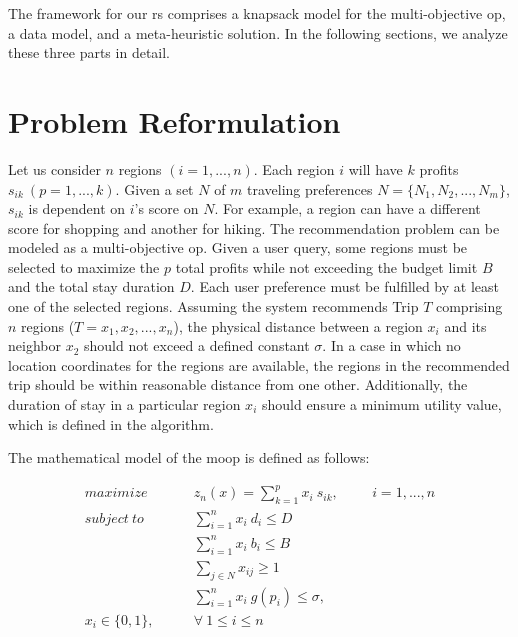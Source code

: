 The framework for our \gls{rs} comprises a knapsack model for the multi-objective \gls{op}, a data model, and a meta-heuristic solution. In the following sections, we analyze these three parts in detail.


\section{Problem Reformulation} \label{sec:problem_definition}

Let us consider $n$ regions $(i = 1, ..., n)$. Each region $i$ will have $k$ profits $s_{ik}\ (p = 1, ...,k)$. Given a set $N$ of $m$ traveling preferences $N = \{N_1, N_2,...,N_m\}$, $s_{ik}$ is dependent on $i$'s score on $N$. For example, a region can have a different score for shopping and another for hiking.
The recommendation problem can be modeled as a multi-objective \gls{op}. Given a user query, some regions must be selected to maximize the $p$ total profits while not exceeding the budget limit $B$ and the total stay duration $D$. Each user preference must be fulfilled by at least one of the selected regions. Assuming the system recommends Trip $T$ comprising $n$ regions ($T = {x_1, x_2, ..., x_n}$), the physical distance between a region $x_i$ and its neighbor $x_2$ should not exceed a defined constant $\sigma$. In a case in which no location coordinates for the regions are available, the regions in the recommended trip should be within reasonable distance from one other. Additionally, the duration of stay in a particular region ${x_i}$ should ensure a minimum utility value, which is defined in the algorithm.

The mathematical model of the \gls{moop} is defined as follows:

\begin{align}
    \tag{1}maximize \qquad  &z_n(x) = \sum_{k=1}^p x_i\ s_{ik}, \hspace{1cm} i = 1,...,n \label{eq:3_1a}\\
    \tag{2}subject \ to \qquad &\sum_{i=1}^n x_i\ d_i  \leq D \label{eq:3_1b}\\
    \tag{3}&\sum_{i=1}^n x_i\ b_i \leq B \label{eq:3_1c}\\
    \tag{4}&\sum_{j \in N} x_{ij} \geq 1 \label{eq:3_1e}\\ 
    \tag{5}&\sum_{i=1}^n x_{i} \ g(p_i) \leq \sigma,  \hspace{1cm}  \label{eq:3_1f} \\
    \tag{7} x_i \in \{0,1\}, \qquad &\forall \ 1 \leq i \leq n \label{eq:3_1f2}
\end{align}


